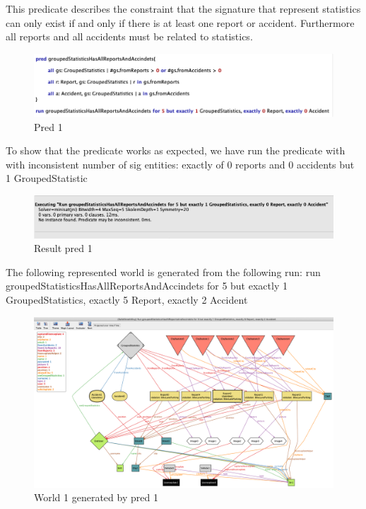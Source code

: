 This predicate describes the constraint that the signature that represent statistics can only exist if and only if there is at least one report or accident.
Furthermore all reports and all accidents must be related to statistics.
\begin{figure}[h]
	\centering
	\includegraphics[width=0.9\linewidth, height=0.15\textheight]{Images/Alloy/test-world11}
	\caption{Pred 1}
	\label{Pred 1}
\end{figure}
\FloatBarrier
To show that the predicate works as expected, we have run the predicate with with inconsistent number of sig entities: exactly of  0 reports and 0 accidents but 1 GroupedStatistic
\begin{figure}[h]
	\centering
	\includegraphics[width=0.9\linewidth, height=0.12\textheight]{Images/Alloy/test-world12}
	\caption{Result pred 1}
	\label{Result pred 1}
\end{figure}
\FloatBarrier
\newpage
The following represented world is generated from the following run: run groupedStatisticsHasAllReportsAndAccindets for 5 but exactly 1 GroupedStatistics, exactly 5 Report, exactly 2 Accident
\begin{figure}[h]
	\centering
	\includegraphics[width=0.9\linewidth, height=0.5\textheight]{Images/Alloy/world1}
	\caption{World 1 generated by pred 1}
	\label{World1 }
\end{figure}
\FloatBarrier
\newpage
